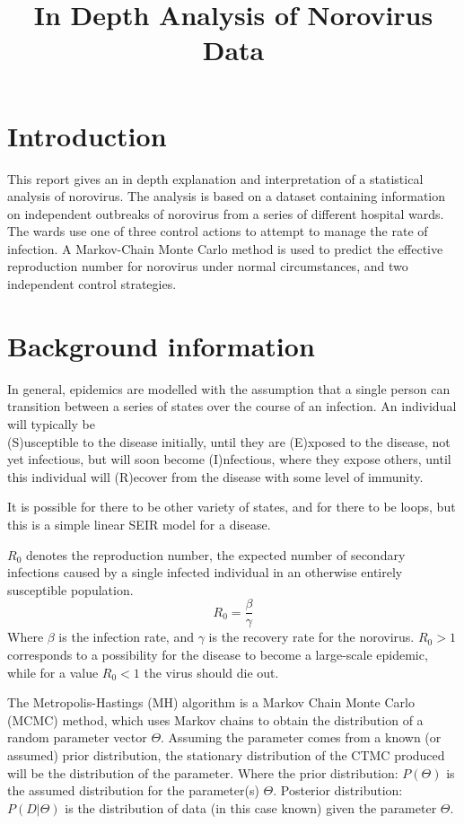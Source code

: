 \documentclass{X:/Documents/Coding/Latex/myassignment}
\title{In Depth Analysis of Norovirus Data}
\begin{document}
\maketitle

\setlength{\parindent}{0pt}
\section{Introduction}
This report gives an in depth explanation and interpretation of a statistical analysis of norovirus. The analysis is based on a dataset containing information on independent outbreaks of norovirus from a series of different hospital wards. The wards use one of three control actions to attempt to manage the rate of infection. 
A Markov-Chain Monte Carlo method is used to predict the effective reproduction number for norovirus under normal circumstances, and two independent control strategies.  

\section{Background information}


In general, epidemics are modelled with the assumption that a single person can transition between a series of states over the course of an infection. An individual will typically be\\
(S)usceptible to the disease initially, until they are (E)xposed to the disease, not yet infectious, but will soon become (I)nfectious, where they expose others, until this individual will (R)ecover from the disease with some level of immunity. 

It is possible for there to be other variety of states, and for there to be loops, but this is a simple linear SEIR model for a disease.

\vspace{0.5em}
$R_0$ denotes the reproduction number, the expected number of secondary infections caused by a single infected individual in an otherwise entirely susceptible population. 
\[R_0 = \frac{\beta}{\gamma}\]
Where $\beta$ is the infection rate, and $\gamma$ is the recovery rate for the norovirus. 
$R_0 > 1$ corresponds to a possibility for the disease to become a large-scale epidemic, while for a value $R_0 <1$ the virus should die out.




The Metropolis-Hastings (MH) algorithm is a Markov Chain Monte Carlo (MCMC) method, which uses Markov chains to obtain the distribution of a random parameter vector $\Theta$. Assuming the parameter comes from a known (or assumed) prior distribution, the stationary distribution of the CTMC produced will be the distribution of the parameter. Where the prior distribution: $P(\Theta)$ is the assumed distribution for the parameter(s) $\Theta$. Posterior distribution: $P(D|\Theta)$ is the distribution of data (in this case known) given the parameter $\Theta$. 
\end{document}
